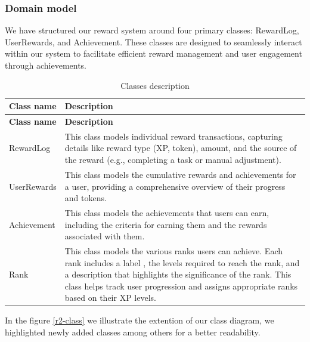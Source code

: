 \subsubsection{Domain model}
We have structured our reward system around four primary classes: RewardLog, UserRewards, and Achievement. These classes are designed to seamlessly interact within our system to facilitate efficient reward management and user engagement through achievements.
\\

\begin{longtable}{ | m{} | m{} | }
    \caption{Classes description}                                                                                                               \\
    \hline
    \textbf{Class name}    & \textbf{Description}                                                                                               \\
    \hline
    \endfirsthead
    \hline
    \textbf{Class name}    & \textbf{Description}                                                                                               \\
    \hline
    \endhead
    \endfoot
    \hline
    \endlastfoot
    RewardLog                 & This class models individual reward transactions, capturing details like  reward type (XP, token), amount, and the source of the reward (e.g., completing a task or manual adjustment). \\
    \hline
    UserRewards               & This class models the cumulative rewards and achievements for a user, providing a comprehensive overview of their progress and tokens. \\
    \hline
    Achievement              & This class models the achievements that users can earn, including the criteria for earning them and the rewards associated with them. \\
    \hline
    Rank                     & This class models the various ranks users can achieve. Each rank includes a label , the levels required to reach the rank, and a description that highlights the significance of the rank. This class helps track user progression and assigns appropriate ranks based on their XP levels. \\
    \hline
\end{longtable}

\noindent In the figure \ref{r2-class} we illustrate the extention of our class diagram, we highlighted
newly added classes among others for a better readability.

